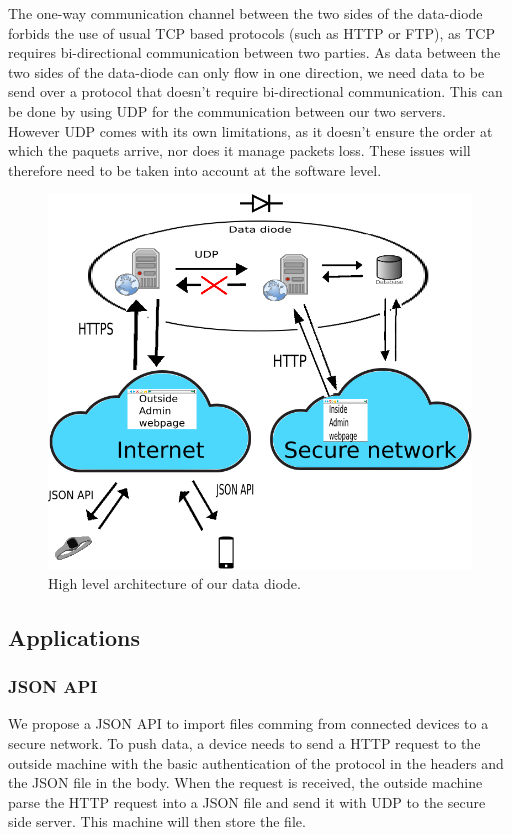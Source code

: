 \documentclass[a4paper,11pt]{article}
\begin{document}
The one-way communication channel between the two sides of the data-diode forbids the use of usual TCP based protocols (such as HTTP or FTP), as TCP requires bi-directional communication between two parties. As data between the two sides of the data-diode can only flow in one direction, we need data to be send over a protocol that doesn't require bi-directional communication. This can be done by using UDP for the communication between our two servers.\\

However UDP comes with its own limitations, as it doesn't ensure the order at which the paquets arrive, nor does it manage packets loss. These issues will therefore need to be taken into account at the software level.\\


\begin{figure}
	\includegraphics[scale=0.7]{img/system2.png}
	\caption{High level architecture of our data diode.}
\end{figure}


\subsection{Applications}
\subsubsection{JSON API}
We propose a JSON API to import files comming from connected devices to a secure network. To push data, a device needs to send a HTTP request to the outside machine with the basic authentication of the protocol in the headers and the JSON file in the body. When the request is received, the outside machine parse the HTTP request into a JSON file and send it with UDP to the secure side server. This machine will then store the file.
\end{document}
